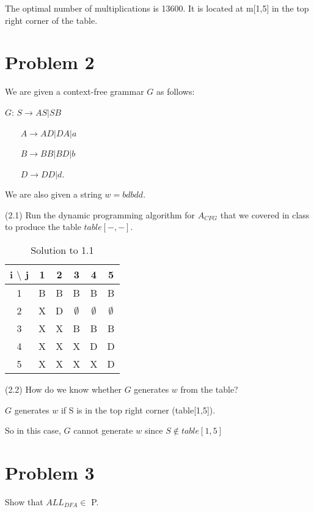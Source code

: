 \documentclass[11pt]{article}
\begin{document}
The optimal number of multiplications is 13600. It is located at m[1,5] in the top right corner of the table. 


\newpage
\section*{Problem 2}

\noindent
We are given a context-free grammar $G$ as follows:
\newline

$G$: $S\rightarrow AS|SB$

~~~  $A\rightarrow AD|DA|a$

~~~  $B\rightarrow BB|BD|b$

~~~  $D\rightarrow DD|d$.

We are also given a string $w=bdbdd$.
\newline

\noindent
(2.1) Run the dynamic programming algorithm for $A_{CFG}$ that we covered in class to produce the table $table[-,-]$.


\begin{table}[H]
    \centering
    \begin{tabular}{c|c c c c c}
       i $\setminus$ j  & 1 & 2 & 3 & 4 & 5 \\
       \hline
       1 & B & B & B & B & B \\
       2 & X & D & $\emptyset$ & $\emptyset$ & $\emptyset$ \\
       3 & X & X & B & B & B \\
       4 & X & X & X & D & D\\
       5 & X & X & X & X & D \\
    \end{tabular}
    \caption{Solution to 1.1}
    \label{tab:1.1}
\end{table}

\noindent
(2.2) How do we know whether $G$ generates $w$ from the table?


$G$ generates $w$ if S is in the top right corner (table[1,5]).

So in this case, $G$ cannot generate $w$ since $S \notin table[1,5]$

\newpage
\section*{Problem 3}

Show that $ALL_{DFA}\in$ P.
\end{document}
